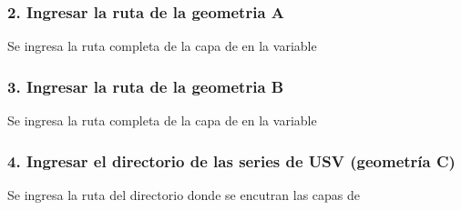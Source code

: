 \documentclass[letterpaper,10pt,spanish]{sphinxmanual}
\begin{document}
\noindent{}


\subsubsection{2. Ingresar la ruta de la geometria A}
\label{\detokenize{nivel_geometrias:ingresar-la-ruta-de-la-geometria-a}}
Se ingresa la ruta completa de la capa de  en la variable

\begin{sphinxVerbatim}[commandchars=\\\{\}]
  
\end{sphinxVerbatim}


\subsubsection{3. Ingresar la ruta de la geometria B}
\label{\detokenize{nivel_geometrias:ingresar-la-ruta-de-la-geometria-b}}
Se ingresa la ruta completa de la capa de  en la variable

\begin{sphinxVerbatim}[commandchars=\\\{\}]
  
\end{sphinxVerbatim}


\subsubsection{4. Ingresar el directorio de las series de USV (geometría C)}
\label{\detokenize{nivel_geometrias:ingresar-el-directorio-de-las-series-de-usv-geometria-c}}
Se ingresa la ruta del directorio donde se encutran las capas
de 

\begin{sphinxVerbatim}[commandchars=\\\{\}]
  
\end{sphinxVerbatim}
\end{document}
